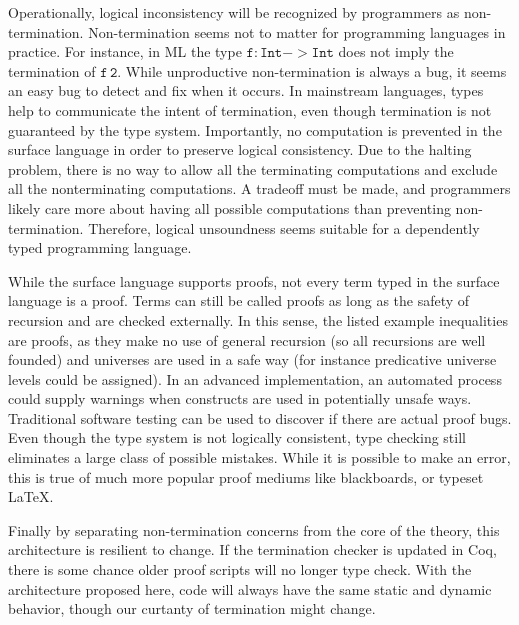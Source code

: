  
Operationally, logical inconsistency will be recognized by programmers as non-termination.
Non-termination seems not to matter for programming languages in practice.
For instance, in ML the type $\mathtt{f:Int->Int}$ does not imply the termination of $\mathtt{f\,2}$.
While unproductive non-termination is always a bug, it seems an easy bug to detect and fix when it occurs.
In mainstream languages, types help to communicate the intent of termination, even though termination is not guaranteed by the type system.
Importantly, no computation is prevented in the surface language in order to preserve logical consistency.
Due to the halting problem, there is no way to allow all the terminating computations and exclude all the nonterminating computations.
A tradeoff must be made, and programmers likely care more about having all possible computations than preventing non-termination.
Therefore, logical unsoundness seems suitable for a dependently typed programming language.
 
 
 
While the surface language supports proofs, not every term typed in the surface language is a proof.
Terms can still be called proofs as long as the safety of recursion and \tit{} are checked externally.
In this sense, the listed example inequalities are proofs, as they make no use of general recursion (so all recursions are well founded) and universes are used in a safe way (for instance predicative universe levels could be assigned).
In an advanced implementation, an automated process could supply warnings when constructs are used in potentially unsafe ways.
Traditional software testing can be used to discover if there are actual proof bugs.
Even though the type system is not logically consistent, type checking still eliminates a large class of possible mistakes.
While it is possible to make an error, this is true of much more popular proof mediums like blackboards, or typeset \LaTeX.
 
Finally by separating non-termination concerns from the core of the theory, this architecture is resilient to change.
If the termination checker is updated in Coq, there is some chance older proof scripts will no longer type check.
With the architecture proposed here, code will always have the same static and dynamic behavior, though our curtanty of termination might change.
 

